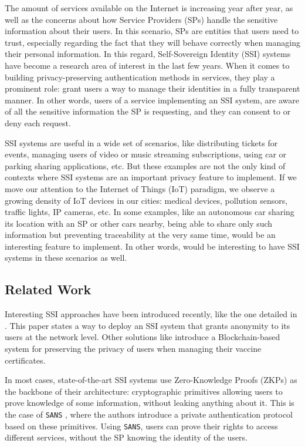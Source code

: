 
The amount of services available on the Internet is increasing year after year, as well as the concerns about how Service Providers (SPs) handle the sensitive information about their users. In this scenario, SPs are entities that users need to trust, especially regarding the fact that they will behave correctly when managing their personal information. In this regard, Self-Sovereign Identity (SSI) systems \cite{sovrin, sov1, belles2022selfsovereign} have become a research area of interest in the last few years. When it comes to building privacy-preserving authentication methods in services, they play a prominent role: grant users a way to manage their identities in a fully transparent manner. In other words, users of a service implementing an SSI system, are aware of all the sensitive information the SP is requesting, and they can consent to or deny each request.

SSI systems are useful in a wide set of scenarios, like distributing tickets for events, managing users of video or music streaming subscriptions, using car or parking sharing applications, etc. But these examples are not the only kind of contexts where SSI systems are an important privacy feature to implement. If we move our attention to the Internet of Things (IoT) paradigm, we observe a growing density of IoT devices in our cities: medical devices, pollution sensors, traffic lights, IP cameras, etc. In some examples, like an autonomous car sharing its location with an SP or other cars nearby, being able to share only such information but preventing traceability at the very same time, would be an interesting feature to implement. In other words, would be interesting to have SSI systems in these scenarios as well.

\subsection{Related Work} 

Interesting SSI approaches have been introduced recently, like the one detailed in \cite{DBLP:journals/corr/abs-2007-00415}. This paper states a way to deploy an SSI system that grants anonymity to its users at the network level. Other solutions like \cite{abid2022novidchain} introduce a Blockchain-based system for preserving the privacy of users when managing their vaccine certificates.

In most cases, state-of-the-art SSI systems use Zero-Knowledge Proofs (ZKPs) \cite{gmr85} as the backbone of their architecture: cryptographic primitives allowing users to prove knowledge of some information, without leaking anything about it. This is the case of \verb!SANS! \cite{salleras2020sans}, where the authors introduce a private authentication protocol based on these primitives. Using \verb!SANS!, users can prove their rights to access different services, without the SP knowing the identity of the users.


